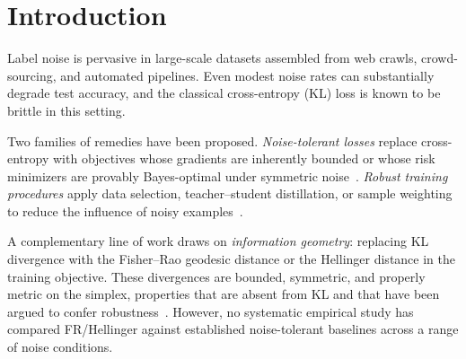 \documentclass[11pt]{article}
\begin{document}
\section{Introduction}

Label noise is pervasive in large-scale datasets assembled from web crawls,
crowd-sourcing, and automated pipelines.
Even modest noise rates can substantially degrade test accuracy, and the
classical cross-entropy (KL) loss is known to be brittle in this setting.

Two families of remedies have been proposed.
\emph{Noise-tolerant losses} replace cross-entropy with objectives whose
gradients are inherently bounded or whose risk minimizers are provably
Bayes-optimal under symmetric noise~\citep{ghosh2017robust,
zhang2018generalized, wang2019symmetric}.
\emph{Robust training procedures} apply data selection, teacher--student
distillation, or sample weighting to reduce the influence of noisy
examples~\citep{han2018coteaching, li2020dividemix}.

A complementary line of work draws on \emph{information geometry}: replacing
KL divergence with the Fisher--Rao geodesic distance or the Hellinger distance
in the training objective.
These divergences are bounded, symmetric, and properly metric on the simplex,
properties that are absent from KL and that have been argued to confer
robustness~\citep{bottoni2026fisherrao}.
However, no systematic empirical study has compared FR/Hellinger against
established noise-tolerant baselines across a range of noise conditions.
\end{document}
